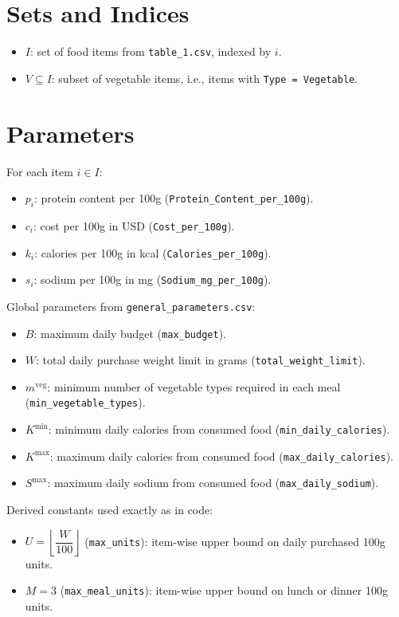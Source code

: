 \section*{Sets and Indices}

\begin{itemize}
    \item $I$: set of food items from \texttt{table\_1.csv}, indexed by $i$.
    \item $V \subseteq I$: subset of vegetable items, i.e., items with \texttt{Type = Vegetable}.
\end{itemize}

\section*{Parameters}

For each item $i \in I$:
\begin{itemize}
    \item $p_i$: protein content per 100g (\texttt{Protein\_Content\_per\_100g}).
    \item $c_i$: cost per 100g in USD (\texttt{Cost\_per\_100g}).
    \item $k_i$: calories per 100g in kcal (\texttt{Calories\_per\_100g}).
    \item $s_i$: sodium per 100g in mg (\texttt{Sodium\_mg\_per\_100g}).
\end{itemize}

Global parameters from \texttt{general\_parameters.csv}:
\begin{itemize}
    \item $B$: maximum daily budget (\texttt{max\_budget}).
    \item $W$: total daily purchase weight limit in grams (\texttt{total\_weight\_limit}).
    \item $m^{\mathrm{veg}}$: minimum number of vegetable types required in each meal (\texttt{min\_vegetable\_types}).
    \item $K^{\min}$: minimum daily calories from consumed food (\texttt{min\_daily\_calories}).
    \item $K^{\max}$: maximum daily calories from consumed food (\texttt{max\_daily\_calories}).
    \item $S^{\max}$: maximum daily sodium from consumed food (\texttt{max\_daily\_sodium}).
\end{itemize}

Derived constants used exactly as in code:
\begin{itemize}
    \item $U = \left\lfloor \dfrac{W}{100} \right\rfloor$ (\texttt{max\_units}): item-wise upper bound on daily purchased 100g units.
    \item $M = 3$ (\texttt{max\_meal\_units}): item-wise upper bound on lunch or dinner 100g units.
\end{itemize}

